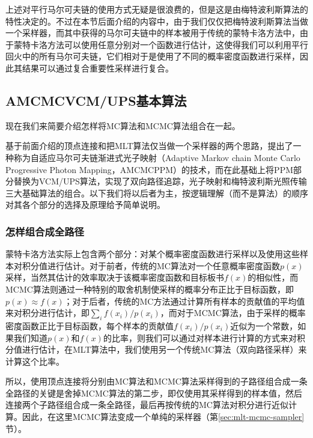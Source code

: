 上述对平行马尔可夫链的使用方式无疑是很浪费的，但是这是由梅特波利斯算法的特性决定的。不过在本节后面介绍的内容中，由于我们仅仅把梅特波利斯算法当做一个采样器，而其中获得的马尔可夫链中的样本被用于传统的蒙特卡洛方法中，由于蒙特卡洛方法可以使用任意分别对一个函数进行估计，这使得我们可以利用平行回火中的所有马尔可夫链，它们相对于是使用了不同的概率密度函数进行采样，因此其结果可以通过复合重要性采样进行复合。




\subsection{AMCMCVCM/UPS基本算法}
现在我们来简要介绍怎样将MC算法和MCMC算法组合在一起。

基于前面介绍的顶点连接和把MLT算法仅当做一个采样器的两个思路，\cite{a:RobustAdaptivePhotonTracingusingPhotonPathVisibility}提出了一种称为自适应马尔可夫链渐进式光子映射（Adaptive Markov chain Monte Carlo Progressive Photon Mapping，AMCMCPPM）的技术，而\cite{a:RobustLightTransportSimulationviaMetropolisedBidirectionalEstimators}在此基础上将PPM部分替换为VCM/UPS算法，实现了双向路径追踪，光子映射和梅特波利斯光照传输三大基础算法的组合。以下我们将以后者为主，按逻辑理解（而不是算法）的顺序对其各个部分的选择及原理给予简单说明。




\subsubsection{怎样组合成全路径}
蒙特卡洛方法实际上包含两个部分：对某个概率密度函数进行采样以及使用这些样本对积分值进行估计。对于前者，传统的MC算法对一个任意概率密度函数$p(x)$采样，当然其估计的效率取决于该概率密度函数和目标板书$f(x)$的相似性，而MCMC算法则通过一种特别的取舍机制使采样的概率分布正比于目标函数，即$p(x)\approx f(x)$；对于后者，传统的MC方法通过计算所有样本的贡献值的平均值来对积分进行估计，即$\sum_if(x_i)/p(x_i)$，而对于MCMC算法，由于采样的概率密度函数正比于目标函数，每个样本的贡献值$f(x_i)/p(x_i)$近似为一个常数，如果我们知道$p(x)$和$f(x)$的比率，则我们可以通过对样本进行计算的方式来对积分值进行估计，在MLT算法中，我们使用另一个传统MC算法（双向路径采样）来计算这个比率。

所以，使用顶点连接将分别由MC算法和MCMC算法采样得到的子路径组合成一条全路径的关键是舍掉MCMC算法的第二步，即仅使用其采样得到的样本值，然后连接两个子路径组合成一条全路径，最后再按传统的MC算法对积分进行近似计算。因此，在这里MCMC算法变成一个单纯的采样器（第\ref{sec:mlt-mcmc-sampler}节）。

